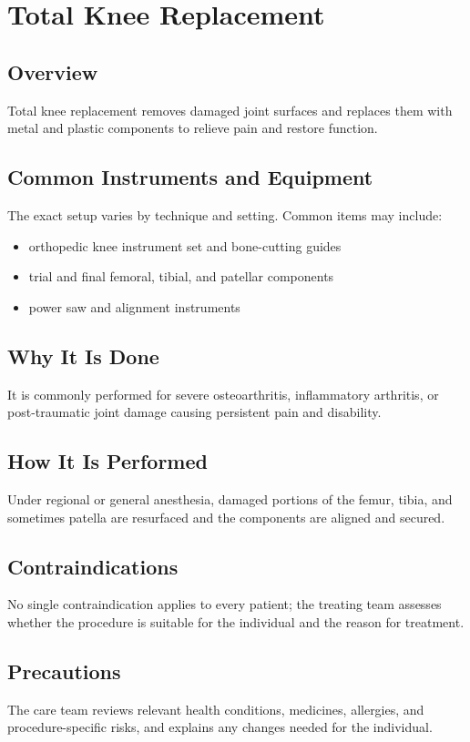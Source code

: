\chapter{Total Knee Replacement}
\section*{Overview}
Total knee replacement removes damaged joint surfaces and replaces them with metal and plastic components to relieve pain and restore function.
\section*{Common Instruments and Equipment}
The exact setup varies by technique and setting. Common items may include:
\begin{itemize}[nosep,leftmargin=*]
  \item orthopedic knee instrument set and bone-cutting guides
  \item trial and final femoral, tibial, and patellar components
  \item power saw and alignment instruments
\end{itemize}

\section*{Why It Is Done}
It is commonly performed for severe osteoarthritis, inflammatory arthritis, or post-traumatic joint damage causing persistent pain and disability.
\section*{How It Is Performed}
Under regional or general anesthesia, damaged portions of the femur, tibia, and sometimes patella are resurfaced and the components are aligned and secured.
\section*{Contraindications}
No single contraindication applies to every patient; the treating team assesses whether the procedure is suitable for the individual and the reason for treatment.

\section*{Precautions}
The care team reviews relevant health conditions, medicines, allergies, and procedure-specific risks, and explains any changes needed for the individual.

